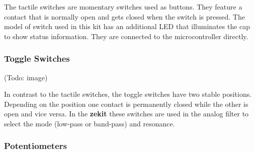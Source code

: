 \documentclass{scrartcl}
\begin{document}
The tactile switches are momentary switches used as buttons. They feature a contact that is normally open and gets closed when the switch is pressed. The model of switch used in this kit has an additional LED that illuminates the cap to show status information. They are connected to the microcontroller directly.

\subsubsection{Toggle Switches}

\begin{center}
    (Todo: image)
\end{center}

In contrast to the tactile switches, the toggle switches have two stable positions. Depending on the position one contact is permanently closed while the other is open and vice versa. In the \textbf{zekit} these switches are used in the analog filter to select the mode (low-pass or band-pass) and resonance.

\subsubsection{Potentiometers}
\end{document}
